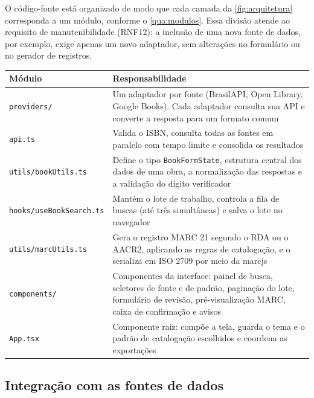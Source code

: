 O código-fonte está organizado de modo que cada camada da \autoref{fig:arquitetura} corresponda a um módulo, conforme o \autoref{qua:modulos}. Essa divisão atende ao requisito de manutenibilidade (RNF12): a inclusão de uma nova fonte de dados, por exemplo, exige apenas um novo adaptador, sem alterações no formulário ou no gerador de registros.

\begin{quadro}[htbp]
    \centering
    \caption{Módulos do código-fonte do Cataloga+}
    \label{qua:modulos}
    \footnotesize
    \begin{tabular}{|p{}|p{}|}
        \hline
        \textbf{Módulo} & \textbf{Responsabilidade} \\ \hline
        \texttt{providers/} & Um adaptador por fonte (BrasilAPI, Open Library, Google Books). Cada adaptador consulta sua API e converte a resposta para um formato comum \\ \hline
        \texttt{api.ts} & Valida o ISBN, consulta todas as fontes em paralelo com tempo limite e consolida os resultados \\ \hline
        \texttt{utils/bookUtils.ts} & Define o tipo \texttt{BookFormState}, estrutura central dos dados de uma obra, a normalização das respostas e a validação do dígito verificador \\ \hline
        \texttt{hooks/useBookSearch.ts} & Mantém o lote de trabalho, controla a fila de buscas (até três simultâneas) e salva o lote no navegador \\ \hline
        \texttt{utils/marcUtils.ts} & Gera o registro MARC 21 segundo o RDA ou o AACR2, aplicando as regras de catalogação, e o serializa em ISO 2709 por meio da marcjs \\ \hline
        \texttt{components/} & Componentes da interface: painel de busca, seletores de fonte e de padrão, paginação do lote, formulário de revisão, pré-visualização MARC, caixa de confirmação e avisos \\ \hline
        \texttt{App.tsx} & Componente raiz: compõe a tela, guarda o tema e o padrão de catalogação escolhidos e coordena as exportações \\ \hline
    \end{tabular}
\end{quadro}

\subsection{Integração com as fontes de dados}
\label{subsec:integracao}

